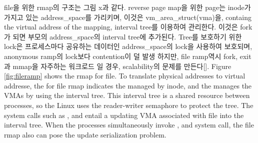 \ifkor
file을 위한 rmap의 구조는 그림 x과 같다. 
reverse page map을 위한 page는 inode가 가지고 있는 address\_space를 가리키며, 이것은
vm\_area\_struct(vma)을, containg the virtual address of the mapping, interval
tree를 이용하여 관리한다. 이것은 fork가 되면 부모의 address\_space의 interval tree에 추가된다.
Tree를 보호하기 위한 lock은 프로세스마다 공유하는 데이터인 address\_space의 lock을 사용하여
보호되며, anonymous ramp의 lock보다 contention이 덜 발생 하지만, file ramp역시 fork, exit과
mmap을 자주하는 워크로드 일 경우, scalability의 문제를 만든다[]. 
\else
Figure \ref{fig:fileramp} shows the rmap for file.
To translate physical addresses to virtual addresse, the  for
file rmap indicates the  managed by inode, and
the  manages the VMAs by using the interval tree.
This interval tree is a shared resource between processes, so the Linux uses the
reader-writer semaphore to protect the tree.
The system calls such as ,  and  entail
a updating VMA associated with file into the interval tree.
When the processes simultaneously invoke ,  and
 system call, the file rmap also can pose the update serialization
problem.
\fi


